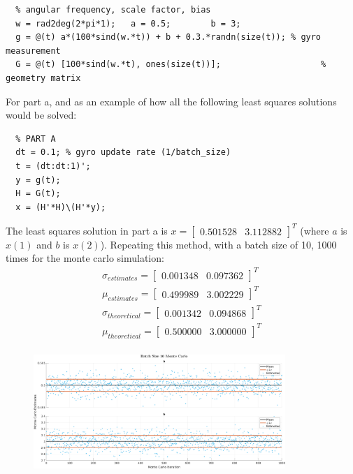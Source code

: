 \documentclass[11pt]{article}
\begin{document}
\begin{enumerate}[label=\textbf{\arabic*.}]
\begin{lstlisting}
  % angular frequency, scale factor, bias
  w = rad2deg(2*pi*1);   a = 0.5;        b = 3;
  g = @(t) a*(100*sind(w.*t)) + b + 0.3.*randn(size(t)); % gyro measurement
  G = @(t) [100*sind(w.*t), ones(size(t))];                    % geometry matrix
  \end{lstlisting}
  For part a, and as an example of how all the following least squares 
  solutions would be solved:
  \begin{lstlisting}
  % PART A
  dt = 0.1; % gyro update rate (1/batch_size)
  t = (dt:dt:1)';
  y = g(t);
  H = G(t);
  x = (H'*H)\(H'*y);
  \end{lstlisting}
  The least squares solution in part a is $x=\begin{bmatrix} 0.501528 & 
  3.112882 \end{bmatrix}^T$ (where $a$ is $x(1)$ and $b$ is $x(2)$). Repeating 
  this method, with a batch size of 10, 1000 times for the monte carlo 
  simulation:
  \begin{equation*}
    \begin{split}
      \sigma_{estimates} = \begin{bmatrix} 0.001348 & 0.097362 \end{bmatrix}^T \\
      \mu_{estimates} = \begin{bmatrix} 0.499989 & 3.002229 \end{bmatrix}^T \\
      \sigma_{theoretical} = \begin{bmatrix} 0.001342 & 0.094868 \end{bmatrix}^T \\
      \mu_{theoretical} = \begin{bmatrix} 0.500000 & 3.000000 \end{bmatrix}^T \\
    \end{split}
  \end{equation*}
  \begin{figure}[H]
    \centering
    \includegraphics[width=0.85\textwidth]{3b.png}

\end{figure}
\end{enumerate}
\end{document}
